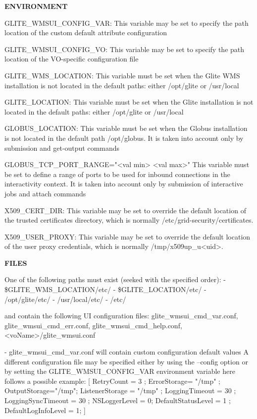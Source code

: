 {\medskip
\textbf{ENVIRONMENT}
\smallskip


GLITE\_WMSUI\_CONFIG\_VAR:  This variable may be set to specify the path location of the custom default attribute configuration

GLITE\_WMSUI\_CONFIG\_VO: This variable may be set to specify the path location of the VO-specific configuration file

GLITE\_WMS\_LOCATION:  This variable must be set when the Glite WMS installation is not located in the default paths: either /opt/glite or /usr/local

GLITE\_LOCATION: This variable must be set when the Glite installation is not located in the default paths: either /opt/glite or /usr/local


GLOBUS\_LOCATION: This variable must be set when the Globus installation is not located in the default path /opt/globus.
It is taken into account only by submission and get-output commands

GLOBUS\_TCP\_PORT\_RANGE="<val min> <val max>" This variable must be set to define a range of ports to be used for inbound connections in the interactivity context.
It is taken into account only by submission of interactive jobs and attach commands

X509\_CERT\_DIR: This variable may be set to override the default location of the trusted certificates directory, which is normally /etc/grid-security/certificates.

X509\_USER\_PROXY: This variable may be set to override the default location of the user proxy credentials, which is normally /tmp/x509up\_u<uid>.

\medskip
\textbf{FILES}
\smallskip


One of the following paths must exist (seeked with the specified order):
- \$GLITE\_WMS\_LOCATION/etc/
- \$GLITE\_LOCATION/etc/
- /opt/glite/etc/
- /usr/local/etc/
- /etc/

and contain the following UI configuration files:
glite\_wmsui\_cmd\_var.conf, glite\_wmsui\_cmd\_err.conf, glite\_wmsui\_cmd\_help.conf, <voName>/glite\_wmsui.conf

- glite\_wmsui\_cmd\_var.conf will contain custom configuration default values
A different configuration file may be specified either by using the --config option or by setting the GLITE\_WMSUI\_CONFIG\_VAR environment variable
here follows a possible example:
[
RetryCount = 3 ;
ErrorStorage= "/tmp" ;
OutputStorage="/tmp";
ListenerStorage = "/tmp" ;
LoggingTimeout = 30 ;
LoggingSyncTimeout = 30 ;
NSLoggerLevel = 0;
DefaultStatusLevel = 1 ;
DefaultLogInfoLevel = 1;
]

}
